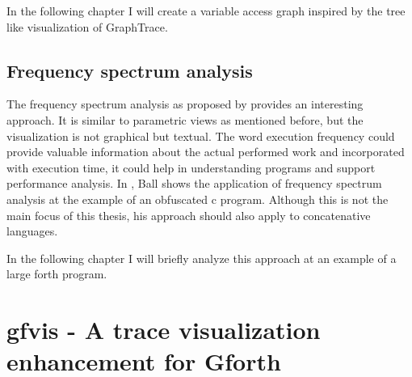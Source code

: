 In the following chapter I will create a variable access graph inspired by the tree like visualization of GraphTrace.

\subsection*{Frequency spectrum analysis}

The frequency spectrum analysis as proposed by \cite{Ball:1999:CDA:318774.318944} provides an interesting approach. It is similar to parametric views as mentioned before, but the visualization is not graphical but textual. The word execution frequency could provide valuable information about the actual performed work and incorporated with execution time, it could help in understanding programs and support performance analysis. In \cite{Ball:1999:CDA:318774.318944}, Ball shows the application of frequency spectrum analysis at the example of an obfuscated c program. Although this is not the main focus of this thesis, his approach should also apply to concatenative languages.

In the following chapter I will briefly analyze this approach at an example of a large forth program.

\section{gfvis - A trace visualization enhancement for Gforth}

